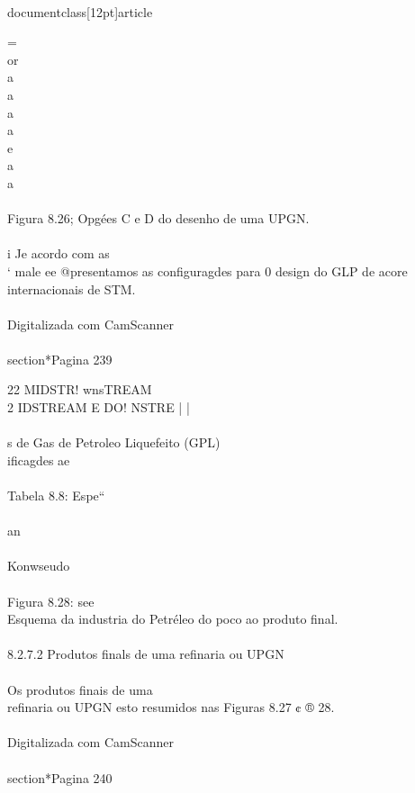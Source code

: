 \\documentclass[12pt]{article}
\begin{document}
=\\
or\\
a\\
a\\
a\\
a\\
e\\
a\\
a\\
\\
Figura 8.26; Opgées C e D do desenho de uma UPGN.\\
\\
i Je acordo com as\\
‘ male ee @presentamos as configuragdes para 0 design do GLP de acore\\
internacionais de STM.\\
\\
Digitalizada com CamScanner\\

\\section*{Pagina 239}

22 MIDSTR! wnsTREAM\\
2 IDSTREAM E DO! NSTRE | |\\
\\
s de Gas de Petroleo Liquefeito (GPL)\\
ificagdes ae\\
\\
Tabela 8.8: Espe“\\
\\
an\\
\\
Konwseudo\\
\\
Figura 8.28: see\\
Esquema da industria do Petréleo do poco ao produto final.\\
\\
8.2.7.2 Produtos finals de uma refinaria ou UPGN\\
\\
Os produtos finais de uma\\
refinaria ou UPGN esto resumidos nas Figuras 8.27 ¢ ® 28.\\
\\
Digitalizada com CamScanner\\

\\section*{Pagina 240}
\end{document}
